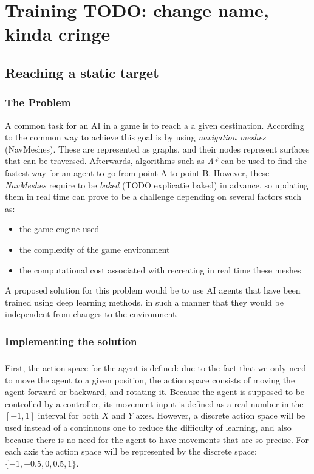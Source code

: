 \chapter{Training TODO: change name, kinda cringe}
\section{Reaching a static target}
\subsection{The Problem}
A common task for an AI in a game is to reach a a given destination. According to \cite{alonso2020deeplearningnavigation} the common way to achieve this goal is by using \emph{navigation meshes} (NavMeshes). These are represented as graphs, and their nodes represent surfaces that can be traversed. Afterwards, algorithms such as \emph{A*} can be used to find the fastest way for an agent to go from point A to point B. However, these \emph{NavMeshes} require to be \emph{baked} (TODO explicatie baked) in advance, so updating them in real time can prove to be a challenge depending on several factors such as:
\begin{itemize}
    \item the game engine used
    \item the complexity of the game environment
    \item the computational cost associated with recreating in real time these meshes
\end{itemize}

A proposed solution for this problem would be to use AI agents that have been trained using deep learning methods, in such a manner that they would be independent from changes to the environment.

\subsection{Implementing the solution}
\paragraph{}
First, the action space for the agent is defined: due to the fact that we only need to move the agent to a given position, the action space consists of moving the agent forward or backward, and rotating it. Because the agent is supposed to be controlled by a controller, its movement input is defined as a real number in the $[-1, 1]$ interval for both $X$ and $Y$ axes. However, a discrete action space will be used instead of a continuous one to reduce the difficulty of learning, and also because there is no need for the agent to have movements that are so precise. For each axis the action space will be represented by the discrete space: $\{-1, -0.5, 0, 0.5, 1\}$.

